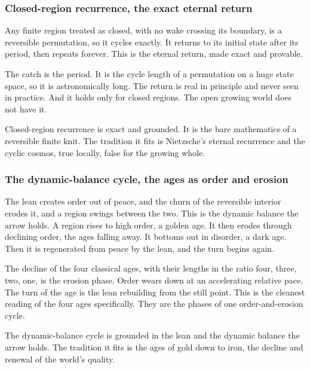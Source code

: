\subsubsection{Closed-region recurrence, the exact eternal return}

Any finite region treated as closed, with no wake crossing its boundary, is a reversible permutation, so it cycles exactly. It returns to its initial state after its period, then repeats forever. This is the eternal return, made exact and provable.

The catch is the period. It is the cycle length of a permutation on a huge state space, so it is astronomically long. The return is real in principle and never seen in practice. And it holds only for closed regions. The open growing world does not have it.

\begin{result}
Closed-region recurrence is exact and grounded. It is the bare mathematics of a reversible finite knit. The tradition it fits is Nietzsche's eternal recurrence and the cyclic cosmos, true locally, false for the growing whole.
\end{result}

\subsubsection{The dynamic-balance cycle, the ages as order and erosion}

The lean creates order out of peace, and the churn of the reversible interior erodes it, and a region swings between the two. This is the dynamic balance the arrow holds. A region rises to high order, a golden age. It then erodes through declining order, the ages falling away. It bottoms out in disorder, a dark age. Then it is regenerated from peace by the lean, and the turn begins again.

The decline of the four classical ages, with their lengths in the ratio four, three, two, one, is the erosion phase. Order wears down at an accelerating relative pace. The turn of the age is the lean rebuilding from the still point. This is the cleanest reading of the four ages specifically. They are the phases of one order-and-erosion cycle.

\begin{result}
The dynamic-balance cycle is grounded in the lean and the dynamic balance the arrow holds. The tradition it fits is the ages of gold down to iron, the decline and renewal of the world's quality.
\end{result}

